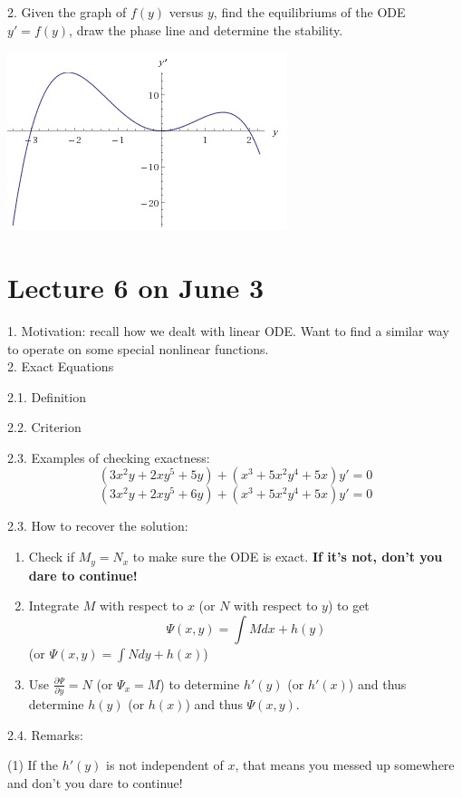 \documentclass[11pt]{article}
\begin{document}
2. Given the graph of $f(y)$ versus $y$, find the equilibriums of the ODE $y'=f(y)$, draw the phase line and determine the stability. 
\begin{center}
\includegraphics{Plot.jpeg}
\end{center}


\newpage

\section{Lecture 6 on June 3}

1. Motivation: recall how we dealt with linear ODE. Want to find a similar way to operate on some special nonlinear functions.\\

2. Exact Equations

2.1. Definition

2.2. Criterion

2.3. Examples of checking exactness:
$$(3x^2y+ 2xy^5+ 5y) + (x^3+ 5x^2y^4+ 5x)y'=0$$
$$(3x^2y+ 2xy^5+ 6y) + (x^3+ 5x^2y^4+ 5x)y'=0$$

2.3. How to recover the solution: 

\begin{enumerate}
\item Check if $M_y = N_x$ to make sure the ODE is exact. \textbf{If it's not, don't you dare to continue!}
\item Integrate $M$ with respect to $x$ (or $N$ with respect to $y$) to get 
$$\Psi(x,y)=\int Mdx + h(y)$$
(or $\Psi(x,y)=\int Ndy + h(x)$)
\item Use $\displaystyle{\frac{\partial \Psi}{\partial y}=N}$ (or $\Psi_x=M$) to determine $h'(y)$ (or $h'(x)$) and thus determine $h(y)$ (or $h(x)$) and thus $\Psi(x,y)$.
\end{enumerate}
2.4. Remarks: 

(1) If the $h'(y)$ is not independent of $x$, that means you messed up somewhere and don't you dare to continue!
\end{document}

